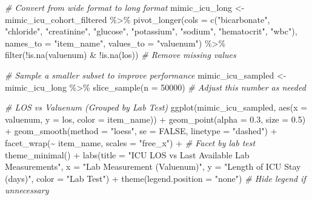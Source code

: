 \documentclass[
]{article}
\newenvironment{Shaded}{\begin{snugshade}}{\end{snugshade}}
\newcommand{\AttributeTok}[1]{\textcolor[rgb]{0.77,0.63,0.00}{#1}}
\newcommand{\CommentTok}[1]{\textcolor[rgb]{0.56,0.35,0.01}{\textit{#1}}}
\newcommand{\ConstantTok}[1]{\textcolor[rgb]{0.00,0.00,0.00}{#1}}
\newcommand{\DecValTok}[1]{\textcolor[rgb]{0.00,0.00,0.81}{#1}}
\newcommand{\FloatTok}[1]{\textcolor[rgb]{0.00,0.00,0.81}{#1}}
\newcommand{\FunctionTok}[1]{\textcolor[rgb]{0.00,0.00,0.00}{#1}}
\newcommand{\NormalTok}[1]{\textcolor[rgb]{0.00,0.00,0.00}{#1}}
\newcommand{\OtherTok}[1]{\textcolor[rgb]{0.56,0.35,0.01}{#1}}
\newcommand{\SpecialCharTok}[1]{\textcolor[rgb]{0.00,0.00,0.00}{#1}}
\newcommand{\StringTok}[1]{\textcolor[rgb]{0.31,0.60,0.02}{#1}}
\begin{document}
\begin{Shaded}
\begin{Highlighting}[]
\CommentTok{\# Convert from wide format to long format}
\NormalTok{mimic\_icu\_long }\OtherTok{\textless{}{-}}\NormalTok{ mimic\_icu\_cohort\_filtered }\SpecialCharTok{\%\textgreater{}\%}
  \FunctionTok{pivot\_longer}\NormalTok{(}\AttributeTok{cols =} \FunctionTok{c}\NormalTok{(}\StringTok{"bicarbonate"}\NormalTok{, }\StringTok{"chloride"}\NormalTok{, }\StringTok{"creatinine"}\NormalTok{, }\StringTok{"glucose"}\NormalTok{,}
                        \StringTok{"potassium"}\NormalTok{, }\StringTok{"sodium"}\NormalTok{, }\StringTok{"hematocrit"}\NormalTok{, }\StringTok{"wbc"}\NormalTok{),}
               \AttributeTok{names\_to =} \StringTok{"item\_name"}\NormalTok{, }\AttributeTok{values\_to =} \StringTok{"valuenum"}\NormalTok{) }\SpecialCharTok{\%\textgreater{}\%}
  \FunctionTok{filter}\NormalTok{(}\SpecialCharTok{!}\FunctionTok{is.na}\NormalTok{(valuenum) }\SpecialCharTok{\&} \SpecialCharTok{!}\FunctionTok{is.na}\NormalTok{(los))  }\CommentTok{\# Remove missing values}
\end{Highlighting}
\end{Shaded}

\begin{Shaded}
\begin{Highlighting}[]
\CommentTok{\# Sample a smaller subset to improve performance}
\NormalTok{mimic\_icu\_sampled }\OtherTok{\textless{}{-}}\NormalTok{ mimic\_icu\_long }\SpecialCharTok{\%\textgreater{}\%}
  \FunctionTok{slice\_sample}\NormalTok{(}\AttributeTok{n =} \DecValTok{50000}\NormalTok{)  }\CommentTok{\# Adjust this number as needed}

\CommentTok{\# LOS vs Valuenum (Grouped by Lab Test)}
\FunctionTok{ggplot}\NormalTok{(mimic\_icu\_sampled, }\FunctionTok{aes}\NormalTok{(}\AttributeTok{x =}\NormalTok{ valuenum, }\AttributeTok{y =}\NormalTok{ los, }\AttributeTok{color =}\NormalTok{ item\_name)) }\SpecialCharTok{+}
  \FunctionTok{geom\_point}\NormalTok{(}\AttributeTok{alpha =} \FloatTok{0.3}\NormalTok{, }\AttributeTok{size =} \FloatTok{0.5}\NormalTok{) }\SpecialCharTok{+}  
  \FunctionTok{geom\_smooth}\NormalTok{(}\AttributeTok{method =} \StringTok{"loess"}\NormalTok{, }\AttributeTok{se =} \ConstantTok{FALSE}\NormalTok{, }\AttributeTok{linetype =} \StringTok{"dashed"}\NormalTok{) }\SpecialCharTok{+}  
  \FunctionTok{facet\_wrap}\NormalTok{(}\SpecialCharTok{\textasciitilde{}}\NormalTok{ item\_name, }\AttributeTok{scales =} \StringTok{"free\_x"}\NormalTok{) }\SpecialCharTok{+}  \CommentTok{\# Facet by lab test}
  \FunctionTok{theme\_minimal}\NormalTok{() }\SpecialCharTok{+}
  \FunctionTok{labs}\NormalTok{(}\AttributeTok{title =} \StringTok{"ICU LOS vs Last Available Lab Measurements"}\NormalTok{,}
       \AttributeTok{x =} \StringTok{"Lab Measurement (Valuenum)"}\NormalTok{, }\AttributeTok{y =} \StringTok{"Length of ICU Stay (days)"}\NormalTok{, }
       \AttributeTok{color =} \StringTok{"Lab Test"}\NormalTok{) }\SpecialCharTok{+}
  \FunctionTok{theme}\NormalTok{(}\AttributeTok{legend.position =} \StringTok{"none"}\NormalTok{)  }\CommentTok{\# Hide legend if unnecessary}
\end{Highlighting}
\end{Shaded}
\end{document}
